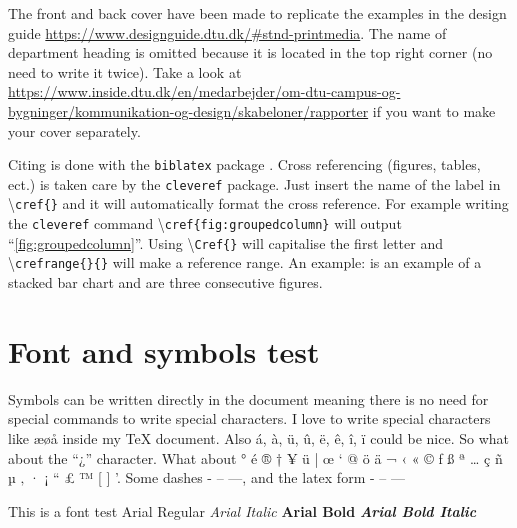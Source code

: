 The front and back cover have been made to replicate the examples in the design guide \url{https://www.designguide.dtu.dk/#stnd-printmedia}. The name of department heading is omitted  because it is located in the top right corner (no need to write it twice). Take a look at \url{https://www.inside.dtu.dk/en/medarbejder/om-dtu-campus-og-bygninger/kommunikation-og-design/skabeloner/rapporter} if you want to make your cover separately. 

Citing is done with the \texttt{biblatex} package \cite{publication1}. Cross referencing (figures, tables, ect.) is taken care by the \texttt{cleveref} package. Just insert the name of the label in \textbackslash \texttt{cref\{\}} and it will automatically format the cross reference. For example writing the \texttt{cleveref} command \textbackslash \texttt{cref\{fig:groupedcolumn\}} will output ``\cref{fig:groupedcolumn}''. Using \textbackslash \texttt{Cref\{\}} will capitalise the first letter and \textbackslash \texttt{crefrange\{\}\{\}} will make a reference range. An example:  is an example of a stacked bar chart and  are three consecutive figures.

\section{Font and symbols test}
Symbols can be written directly in the document meaning there is no need for special commands to write special characters. I love to write special characters like æøå inside my \TeX{} document. Also á, à, ü, û, ë, ê, î, ï could be nice. So what about the ``¿'' character. What about ° é ® † ¥ ü | œ ‘ @ ö ä ¬ ‹ « © ƒ ß ª … ç ñ µ ‚ · ¡ “ £ ™ [ ] '. Some dashes - – —, and the latex form - -- --- 

This is a font test \newline 
Arial Regular \newline 
\textit{Arial Italic} \newline 
\textbf{Arial Bold} \newline 
\textbf{\textit{Arial Bold Italic}}
